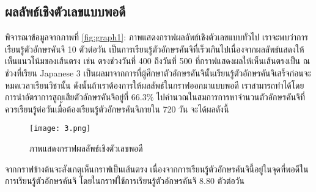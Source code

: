 \documentclass{article}
\begin{document}
\subsection{ผลลัพธ์เชิงตัวเลขแบบพอดี}
พิจารณาข้อมูลจากภาพที่ \ref{fig:graph1}: ภาพแสดงกราฟผลลัพธ์เชิงตัวเลขแบบทั่วไป เราจะพบว่าการเรียนรู้ตัวอักษรคันจิ 10 ตัวต่อวัน เป็นการเรียนรู้ตัวอักษรคันจิที่เร็วเกินไปเนื่องจากผลลัพธ์แสดงให้เห็นแนวโน้มของเส้นตรง เช่น ตรงช่วงวันที่ 400 ถึงวันที่ 500 ที่กราฟแสดงผลให้เห็นเส้นตรงเป็น ณ ช่วงที่เรียน Japanese 3 เป็นผลมาจากการที่ผู้ศึกษาตัวอักษรคันจินั้นเรียนรู้ตัวอักษรคันจิเสร็จก่อนจะหมดเวลาเรียนวิชานั้น ดังนั้นถ้าเราต้องการให้ผลลัพธ์ในกราฟออกมาแบบพอดี เราสามารถทำได้โดยการนำอัตราการสูญเสียตัวอักษรคันจิอยู่ที่ 66.3\%\cite{ebbinghaus1913memory} ไปคำนวณในสมการการหาจำนวนตัวอักษรคันจิที่ควรเรียนรู้ต่อวันเมื่อต้องเรียนรู้ตัวอักษรคันจิภายใน 720 วัน จะได้ผลดังนี้ 

\begin{figure}[h!]
\centering
\texttt{[image: 3.png]}
\caption{ภาพแสดงกราฟผลลัพธ์เชิงตัวเลขพอดี}
\label{fig:graph2}
\end{figure}

จากกราฟข้างต้นจะสังเกตุเห็นกราฟเป็นเส้นตรง เนื่องจากการเรียนรู้ตัวอักษรคันจินี้อยู่ในจุดที่พอดีในการเรียนรู้ตัวอักษรคันจิ โดยในกราฟใช้การเรียนรู้ตัวอักษรคันจิ 8.80 ตัวต่อวัน
\end{document}
